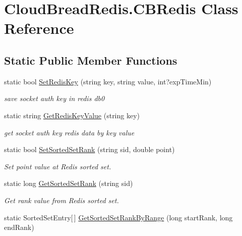 \hypertarget{a00030}{}\section{Cloud\+Bread\+Redis.\+C\+B\+Redis Class Reference}
\label{a00030}
\subsection*{Static Public Member Functions}
\begin{DoxyCompactItemize}
\item 
static bool \hyperlink{a00030_a78e0461fa8abc3fec82245c2595d91ac}{Set\+Redis\+Key} (string key, string value, int?exp\+Time\+Min)\hypertarget{a00030_a78e0461fa8abc3fec82245c2595d91ac}{}\label{a00030_a78e0461fa8abc3fec82245c2595d91ac}

\begin{DoxyCompactList}\small\item\em save socket auth key in redis db0 \end{DoxyCompactList}\item 
static string \hyperlink{a00030_a4339caf935cbbc8ac829cd914f9b3fe9}{Get\+Redis\+Key\+Value} (string key)\hypertarget{a00030_a4339caf935cbbc8ac829cd914f9b3fe9}{}\label{a00030_a4339caf935cbbc8ac829cd914f9b3fe9}

\begin{DoxyCompactList}\small\item\em get socket auth key redis data by key value \end{DoxyCompactList}\item 
static bool \hyperlink{a00030_ab09bc8445fb690da0cdcf9a4983906ed}{Set\+Sorted\+Set\+Rank} (string sid, double point)\hypertarget{a00030_ab09bc8445fb690da0cdcf9a4983906ed}{}\label{a00030_ab09bc8445fb690da0cdcf9a4983906ed}

\begin{DoxyCompactList}\small\item\em Set point value at Redis sorted set. \end{DoxyCompactList}\item 
static long \hyperlink{a00030_af36763a72f5679bc432a013f39beb944}{Get\+Sorted\+Set\+Rank} (string sid)\hypertarget{a00030_af36763a72f5679bc432a013f39beb944}{}\label{a00030_af36763a72f5679bc432a013f39beb944}

\begin{DoxyCompactList}\small\item\em Get rank value from Redis sorted set. \end{DoxyCompactList}\item 
static Sorted\+Set\+Entry\mbox{[}$\,$\mbox{]} \hyperlink{a00030_aa3a4020436145c6f99d2b6f5cc5a5056}{Get\+Sorted\+Set\+Rank\+By\+Range} (long start\+Rank, long end\+Rank)\hypertarget{a00030_aa3a4020436145c6f99d2b6f5cc5a5056}{}\label{a00030_aa3a4020436145c6f99d2b6f5cc5a5056}


\end{DoxyCompactItemize}
